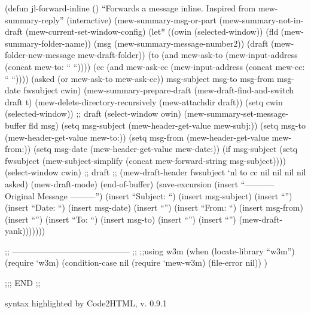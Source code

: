 \documentclass[11pt]{article}
\begin{document}
(defun jl-forward-inline ()
  ``Forwards a message inline. Inspired from mew-summary-reply''
  (interactive)
  (mew-summary-msg-or-part
   (mew-summary-not-in-draft
    (mew-current-set-window-config)
    (let* ((owin (selected-window))
           (fld (mew-summary-folder-name))
           (msg (mew-summary-message-number2))
           (draft (mew-folder-new-message mew-draft-folder))
           (to (and mew-ask-to (mew-input-address (concat mew-to: `` ``))))
           (cc (and mew-ask-cc (mew-input-address (concat mew-cc: `` ``))))
           (asked (or mew-ask-to mew-ask-cc))
           msg-subject msg-to msg-from msg-date fwsubject cwin)
      (mew-summary-prepare-draft
       (mew-draft-find-and-switch draft t)
       (mew-delete-directory-recursively (mew-attachdir draft))
       (setq cwin (selected-window)) ;; draft
       (select-window owin)
       (mew-summary-set-message-buffer fld msg)
       (setq msg-subject (mew-header-get-value mew-subj:))
       (setq msg-to (mew-header-get-value mew-to:))
       (setq msg-from (mew-header-get-value mew-from:))
       (setq msg-date (mew-header-get-value mew-date:))
       (if msg-subject
           (setq fwsubject (mew-subject-simplify (concat mew-forward-string msg-subject))))
       (select-window cwin) ;; draft
       ;;
       (mew-draft-header fwsubject `nl to cc nil nil nil nil asked)
       (mew-draft-mode)
       (end-of-buffer)
       (save-excursion
         (insert ``----------- Original Message  ---------\n'')
         (insert ``Subject: ``) (insert msg-subject) (insert ``\n'')
         (insert ``Date: ``) (insert msg-date) (insert ``\n'')
         (insert ``From: ``) (insert msg-from) (insert ``\n'')
         (insert ``To: ``) (insert msg-to) (insert ``\n'')
         (insert ``\n\n'')
         (mew-draft-yank)))))))

;; ------------------------------------------ ;;
;;using w3m
(when (locate-library ``w3m'')
(require `w3m)
(condition-case nil
    (require `mew-w3m)
  (file-error nil))
)
  


;;; END ;;

syntax highlighted by Code2HTML, v. 0.9.1 
\end{document}
